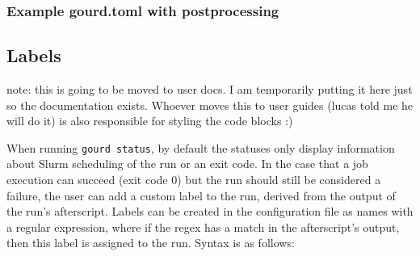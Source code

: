 \subsubsection{Example gourd.toml with postprocessing}


\subsection{Labels}
note: this is going to be moved to user docs.
I am temporarily putting it here just so the documentation exists.
Whoever moves this to user guides (lucas told me he will do it) is also responsible for styling the code blocks :)

When running \verb|gourd status|, by default the statuses only display information about Slurm scheduling of the run or an exit code.
In the case that a job execution can succeed (exit code 0) but the run should still be considered a failure, the user can add a custom label to the run, derived from the output of the run's afterscript.
Labels can be created in the configuration file as names with a regular expression, where if the regex has a match in the afterscript's output, then this label is assigned to the run.
Syntax is as follows:


